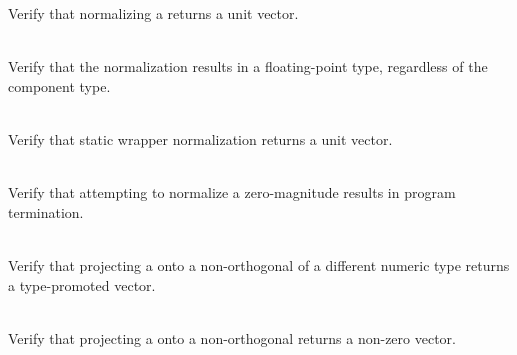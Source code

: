 \begin{DoxyRefList}
\label{test__test000116}%
%
Verify that normalizing a  returns a unit vector.  
\item[{\parbox[t]{\linewidth}{Member \doxylink{_magnitude_tests_8cpp_ac9f8c510ad76efdf35425d566bcb2fed}{Vector4\+DNormalization\+\_\+\+Normalized\+Vector\+Is\+Always\+Typed\+Promoted\+To\+Floating\+Point\+Type} ()}}]\hfill \\
\label{test__test000118}%
%
Verify that the  normalization results in a floating-\/point type, regardless of the component type.  
\item[{\parbox[t]{\linewidth}{Member \doxylink{_magnitude_tests_8cpp_ab9d71c1663e1936cab9d0e4f188219ce}{Vector4\+DNormalization\+\_\+\+Static\+Wrapper\+\_\+\+Non\+Zero\+Vector\+Normalization\+Returns\+Unit\+Vector} ()}}]\hfill \\
\label{test__test000117}%
%
Verify that  static wrapper normalization returns a unit vector.  
\item[{\parbox[t]{\linewidth}{Member \doxylink{_magnitude_tests_8cpp_ac1e5677cd2c09846c0b63922b5b5863b}{Vector4\+DNormalization\+\_\+\+Zero\+Vector\+When\+Normalization\+Causes\+Death} ()}}]\hfill \\
\label{test__test000115}%
%
Verify that attempting to normalize a zero-\/magnitude  results in program termination.  
\item[{\parbox[t]{\linewidth}{Member \doxylink{_projection_tests_8cpp_a885ce49a7546499ce3e7dd308607316c}{Vector4\+DProjection\+\_\+\+Mixed\+Type\+Projection\+Promotes\+Type} ()}}]\hfill \\
\label{test__test000134}%
%
Verify that projecting a  onto a non-\/orthogonal  of a different numeric type returns a type-\/promoted vector.  
\item[{\parbox[t]{\linewidth}{Member \doxylink{_projection_tests_8cpp_a1be55d6d0574d6245f0542df0ed799a2}{Vector4\+DProjection\+\_\+\+Non\+Orthogonal\+Projection\+Returns\+Non\+Zero\+Vector} ()}}]\hfill \\
\label{test__test000130}%
%
Verify that projecting a  onto a non-\/orthogonal  returns a non-\/zero vector.  

\end{DoxyRefList}
